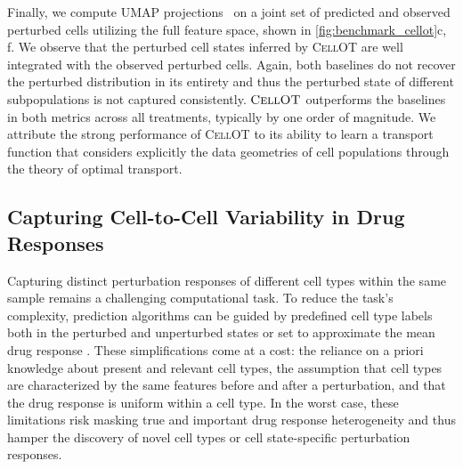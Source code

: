  Finally, we compute \acrfull{UMAP} projections~\citep{umap} on a joint set of predicted and observed perturbed cells utilizing the full feature space, shown in \cref{fig:benchmark_cellot}c, f.
We observe that the perturbed cell states inferred by \textsc{CellOT} are well integrated with the observed perturbed cells. Again, both baselines do not recover the perturbed distribution in its entirety %
and thus the perturbed state of different subpopulations is not captured consistently.
$\textsc{CellOT}$ outperforms the baselines in both metrics across all treatments, typically by one order of magnitude.
We attribute the strong performance of \textsc{CellOT} to its ability to learn a transport function that considers explicitly the data geometries of cell populations through the theory of optimal transport.

\subsection{Capturing Cell-to-Cell Variability in Drug Responses}
 Capturing distinct perturbation responses of different cell types within the same sample remains a challenging computational task. To reduce the task's complexity, prediction algorithms can be guided by predefined cell type labels both in the perturbed and unperturbed states \citep{chen2020dissecting} or set to approximate the mean drug response \citep{lotfollahi2019scgen}.  These simplifications come at a cost: the reliance on a priori knowledge about present and relevant cell types, the assumption that cell types are characterized by the same features before and after a perturbation, and that the drug response is uniform within a cell type.
In the worst case, these limitations risk masking true and important drug response heterogeneity  and thus hamper the discovery of novel cell types or cell state-specific perturbation responses.

